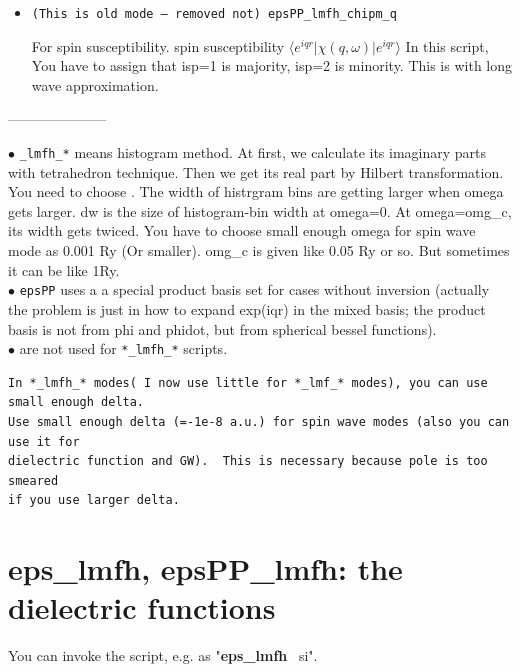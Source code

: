 \documentclass[a4paper,10pt,epsf,fleqn]{article}
\newcommand{\keyw}[1]{\fbox{\tt #1}}
\newcommand{\exe}[1]{{\bf #1}}
\newcommand{\raw}[1]{{\tt #1}}
\begin{document}
{{{\begin{itemize}
\item \raw{(This is old mode --- removed not) epsPP\_lmfh\_chipm\_q}

  For spin susceptibility. 
  spin susceptibility $\langle e^{iqr}| \chi(q,\omega) |e^{iqr} \rangle$
  In this script, You have to assign that isp=1 is majority, isp=2 is minority.
  This is with long wave approximation.  

\end{itemize}

---------------------

\noindent $\bullet$ \raw{*\_lmfh\_*} means histogram method. At first, we calculate its imaginary parts
  with tetrahedron technique. Then we get its real part by Hilbert transformation.\\
  You need to choose \keyw{dw,omg\_c}. 
  The width of histrgram bins are getting larger when omega gets larger.
  dw is the size of histogram-bin width at omega=0. 
  At omega=omg\_c, its width gets twiced.
  You have to choose small enough omega for spin wave mode as 0.001 Ry (Or smaller).
  omg\_c is given like 0.05 Ry or so. But sometimes it can be like 1Ry.\\

\noindent $\bullet$ \raw{epsPP} uses a a special product basis set for cases without inversion
  (actually the problem is just in how to expand exp(iqr) in the mixed basis;
   the product basis is not from phi and phidot, but from spherical bessel functions).\\

\noindent $\bullet$ \keyw{EPSrange, EPSdw} are not used for \verb#*_lmfh_*# scripts.


\begin{verbatim}
In *_lmfh_* modes( I now use little for *_lmf_* modes), you can use small enough delta.
Use small enough delta (=-1e-8 a.u.) for spin wave modes (also you can use it for 
dielectric function and GW).  This is necessary because pole is too smeared 
if you use larger delta.
\end{verbatim}



\section{eps\_lmfh, epsPP\_lmfh: the dielectric functions}

You can invoke the script, e.g. as "\exe{eps\_lmfh} \ si".

}}}
\end{document}
